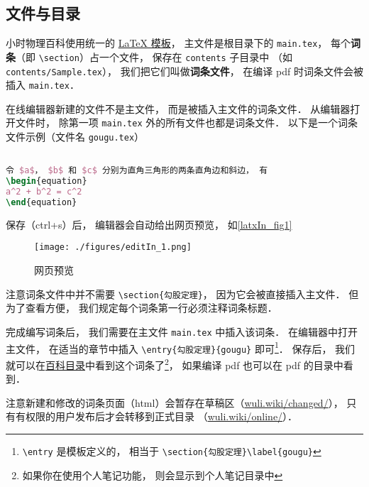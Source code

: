 

\subsection{文件与目录}

小时物理百科使用统一的 \href{https://github.com/MacroUniverse/PhysWiki}{LaTeX 模板}， 主文件是根目录下的 \verb|main.tex|， 每个\textbf{词条}（即 \verb|\section|）占一个文件， 保存在 \verb|contents| 子目录中 （如 \verb|contents/Sample.tex|）， 我们把它们叫做\textbf{词条文件}， 在编译 pdf 时词条文件会被插入 \verb|main.tex|．

在线编辑器新建的文件不是主文件， 而是被插入主文件的词条文件． 从编辑器打开文件时， 除第一项 \verb|main.tex| 外的所有文件也都是词条文件． 以下是一个词条文件示例（文件名 \verb|gougu.tex|）

\begin{lstlisting}[language=latex]
% 勾股定理

令 $a$， $b$ 和 $c$ 分别为直角三角形的两条直角边和斜边， 有
\begin{equation}
a^2 + b^2 = c^2
\end{equation}
\end{lstlisting}
保存（ctrl+s）后， 编辑器会自动给出网页预览， 如\autoref{latxIn_fig1}
\begin{figure}[ht]
\centering
\texttt{[image: ./figures/editIn\_1.png]}
\caption{网页预览} \label{editIn_fig1}
\end{figure}

注意词条文件中并不需要 \verb|\section{勾股定理}|， 因为它会被直接插入主文件． 但为了查看方便， 我们规定每个词条第一行必须注释词条标题．

完成编写词条后， 我们需要在主文件 \verb|main.tex| 中插入该词条． 在编辑器中打开主文件， 在适当的章节中插入 \verb|\entry{勾股定理}{gougu}| 即可\footnote{\verb|\entry| 是模板定义的， 相当于 \verb|\section{勾股定理}\label{gougu}|}． 保存后， 我们就可以在\href{https://wuli.wiki/changed}{百科目录}中看到这个词条了\footnote{如果你在使用个人笔记功能， 则会显示到个人笔记目录中}， 如果编译 pdf 也可以在 pdf 的目录中看到．

注意新建和修改的词条页面（html）会暂存在草稿区（\href{https://wuli.wiki/changed/}{wuli.wiki/changed/}）， 只有有权限的用户发布后才会转移到正式目录 （\href{https://wuli.wiki/online/}{wuli.wiki/online/}）．
